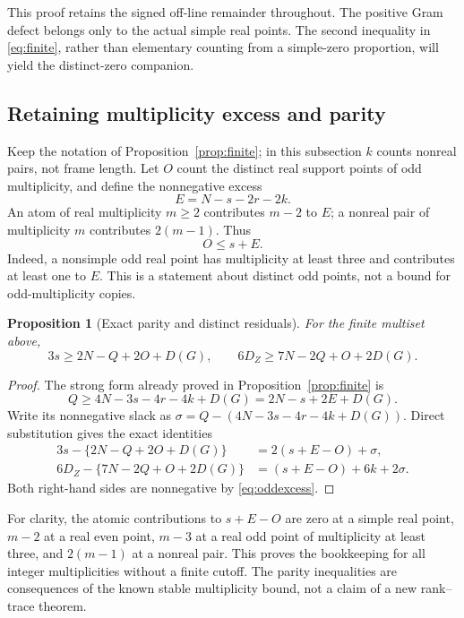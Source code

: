 ﻿\documentclass[11pt]{article}
\newtheorem{proposition}[theorem]{Proposition}
\theoremstyle{remark}
\begin{document}
This proof retains the signed off-line remainder throughout. The positive
Gram defect belongs only to the actual simple real points. The second
inequality in \eqref{eq:finite}, rather than elementary counting from a
simple-zero proportion, will yield the distinct-zero companion.

\subsection{Retaining multiplicity excess and parity}

Keep the notation of Proposition~\ref{prop:finite}; in this subsection $k$
counts nonreal pairs, not frame length. Let $O$ count the distinct real
support points of odd multiplicity, and define the nonnegative excess
\begin{equation}\label{eq:excess}
 E=N-s-2r-2k.
\end{equation}
An atom of real multiplicity $m\ge2$ contributes $m-2$ to $E$; a nonreal
pair of multiplicity $m$ contributes $2(m-1)$. Thus
\begin{equation}\label{eq:oddexcess}
 O\le s+E.
\end{equation}
Indeed, a nonsimple odd real point has multiplicity at least three and
contributes at least one to $E$. This is a statement about distinct odd
points, not a bound for odd-multiplicity copies.

\begin{proposition}[Exact parity and distinct residuals]\label{prop:parity}
For the finite multiset above,
\begin{equation}\label{eq:finiteparity}
 3s\ge2N-Q+2O+D(G),\qquad
 6D_Z\ge7N-2Q+O+2D(G).
\end{equation}
\end{proposition}
\begin{proof}
The strong form already proved in Proposition~\ref{prop:finite} is
\[
 Q\ge4N-3s-4r-4k+D(G)=2N-s+2E+D(G).
\]
Write its nonnegative slack as
$\sigma=Q-(4N-3s-4r-4k+D(G))$. Direct substitution gives the exact
identities
\begin{align}
3s-\{2N-Q+2O+D(G)\}&=2(s+E-O)+\sigma,
\label{eq:parityresidual}\\
6D_Z-\{7N-2Q+O+2D(G)\}&=(s+E-O)+6k+2\sigma.
\label{eq:distinctresidual}
\end{align}
Both right-hand sides are nonnegative by \eqref{eq:oddexcess}.
\end{proof}

For clarity, the atomic contributions to $s+E-O$ are zero at a simple
real point, $m-2$ at a real even point, $m-3$ at a real odd point of
multiplicity at least three, and $2(m-1)$ at a nonreal pair. This proves
the bookkeeping for all integer multiplicities without a finite cutoff.
The parity inequalities are consequences of the known stable multiplicity
bound, not a claim of a new rank--trace theorem.
\end{document}
